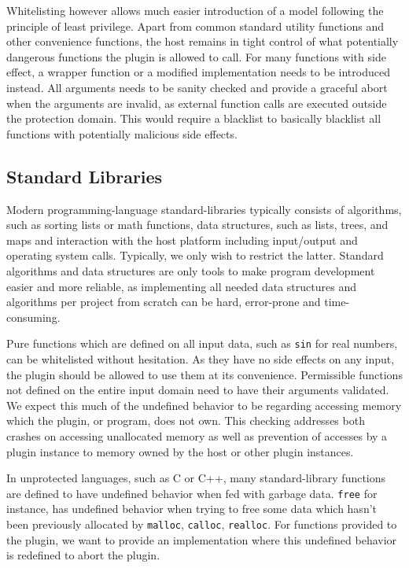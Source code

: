 Whitelisting however allows much easier introduction of a model following the
principle of least privilege.
Apart from common standard utility functions and other convenience functions,
the host remains in tight control of what potentially dangerous functions the
plugin is allowed to call.
For many functions with side effect, a wrapper function or a modified
implementation needs to be introduced instead.
All arguments needs to be sanity checked and provide a graceful abort when the
arguments are invalid, as external function calls are executed outside the
protection domain.
This would require a blacklist to basically blacklist all functions with
potentially malicious side effects.

\subsection {Standard Libraries}

Modern programming-language standard-libraries typically consists of algorithms,
such as sorting lists or math functions, data structures, such as lists, trees,
and maps and interaction with the host platform including input/output and
operating system calls.
Typically, we only wish to restrict the latter.
Standard algorithms and data structures are only tools to make program
development easier and more reliable, as implementing all needed data structures
and algorithms per project from scratch can be hard, error-prone and
time-consuming.

Pure functions which are defined on all input data, such as \texttt{sin} for
real numbers, can be whitelisted without hesitation.
As they have no side effects on any input, the plugin should be allowed to use
them at its convenience.
Permissible functions not defined on the entire input domain need to have their
arguments validated.
We expect this much of the undefined behavior to be regarding accessing memory
which the plugin, or program, does not own.
This checking addresses both crashes on accessing unallocated memory as well as
prevention of accesses by a plugin instance to memory owned by the host or other
plugin instances.

In unprotected languages, such as C or C++, many standard-library functions are
defined to have undefined behavior when fed with garbage data.
\texttt{free} for instance, has undefined behavior when trying to free some data
which hasn't been previously allocated by \texttt{malloc}, \texttt{calloc},
\texttt{realloc}.
For functions provided to the plugin, we want to provide an implementation where
this undefined behavior is redefined to abort the plugin.

